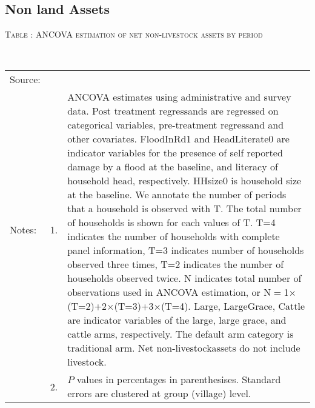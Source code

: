 \subsection{Non land Assets}


\hspace{-1cm}\begin{minipage}[t]{14cm}
\hfil\textsc{\normalsize Table \thetable: ANCOVA estimation of net non-livestock assets by period\label{tab ANCOVA NetNLAssets timevarying}}\\
\setlength{\tabcolsep}{1pt}
\setlength{\baselineskip}{8pt}
\renewcommand{\arraystretch}{.55}
\hfil{}\\
\renewcommand{\arraystretch}{.8}
\setlength{\tabcolsep}{1pt}
\begin{tabular}{>{\hfill\scriptsize}p{1cm}<{}>{\hfill\scriptsize}p{.25cm}<{}>{\scriptsize}p{12cm}<{\hfill}}
Source:& \multicolumn{2}{l}{\scriptsize Estimated with GUK administrative and survey data.}\\
Notes: & 1. & ANCOVA estimates using administrative and survey data. Post treatment regressands are regressed on categorical variables, pre-treatment regressand and other covariates. \textsf{FloodInRd1} and \textsf{HeadLiterate0} are indicator variables for the presence of self reported damage by a flood at the baseline, and literacy of household head, respectively. \textsf{HHsize0} is household size at the baseline. We annotate the number of periods that a household is observed with \textsf{T}. The total number of households is shown for each values of \textsf{T}. \textsf{T=4} indicates the number of households with complete panel information, \textsf{T=3} indicates number of households observed three times, \textsf{T=2} indicates the number of households observed twice. \textsf{N} indicates total number of observations used in ANCOVA estimation, or \textsf{N$=$1$\times$(T=2)+2$\times$(T=3)+3$\times$(T=4)}.  \textsf{Large}, \textsf{LargeGrace}, \textsf{Cattle} are indicator variables of the \textsf{large}, \textsf{large grace}, and \textsf{cattle} arms, respectively. The default arm category is \textsf{traditional} arm. Net non-livestockassets do not include livestock. \\
& 2. & $P$ values in percentages in parenthesises. Standard errors are clustered at group (village) level.
\end{tabular}
\end{minipage}



